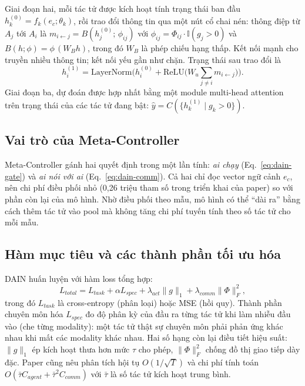 Giai đoạn hai, mỗi tác tử được kích hoạt tính trạng thái ban đầu $h^{(0)}_k = f_k(e_c;\theta_k)$, rồi trao đổi thông tin qua một nút cổ chai nén: thông điệp từ $A_j$ tới $A_i$ là $m_{i\leftarrow j} = B(h^{(0)}_j;\,\phi_{ij})$ với $\phi_{ij} = \Phi_{ij}\cdot\mathbb{I}(g_j > 0)$ và $B(h;\phi) = \phi\,(W_B h)$, trong đó $W_B$ là phép chiếu hạng thấp. Kết nối mạnh cho truyền nhiều thông tin; kết nối yếu gần như chặn. Trạng thái sau trao đổi là
\begin{equation}
h^{(1)}_i = \mathrm{LayerNorm}\Big(h^{(0)}_i + \mathrm{ReLU}\Big(W_u \textstyle\sum_{j\neq i} m_{i\leftarrow j}\Big)\Big).
\label{eq:dain-update}
\end{equation}
Giai đoạn ba, dự đoán được hợp nhất bằng một module multi-head attention trên trạng thái của các tác tử đang bật: $\hat{y} = C(\{h^{(1)}_k \mid g_k > 0\})$.

\subsection{Vai trò của Meta-Controller}
Meta-Controller gánh hai quyết định trong một lần tính: \emph{ai chạy} (Eq.~\ref{eq:dain-gate}) và \emph{ai nói với ai} (Eq.~\ref{eq:dain-comm}). Cả hai chỉ đọc vector ngữ cảnh $e_c$, nên chi phí điều phối nhỏ (0,26 triệu tham số trong triển khai của paper) so với phần còn lại của mô hình. Nhờ điều phối theo mẫu, mô hình có thể ``dài ra'' bằng cách thêm tác tử vào pool mà không tăng chi phí tuyến tính theo số tác tử cho mỗi mẫu.

\subsection{Hàm mục tiêu và các thành phần tối ưu hóa}
DAIN huấn luyện với hàm loss tổng hợp:
\begin{equation}
L_{total} = L_{task} + \alpha L_{spec} + \lambda_{act}\|g\|_1 + \lambda_{comm}\|\Phi\|_F^2,
\label{eq:dain-loss}
\end{equation}
trong đó $L_{task}$ là cross-entropy (phân loại) hoặc MSE (hồi quy). Thành phần chuyên môn hóa $L_{spec}$ đo độ phân kỳ của đầu ra từng tác tử khi làm nhiễu đầu vào (che từng modality): một tác tử thật sự chuyên môn phải phản ứng khác nhau khi mất các modality khác nhau. Hai số hạng còn lại điều tiết hiệu suất: $\|g\|_1$ ép kích hoạt thưa hơn mức $\tau$ cho phép, $\|\Phi\|_F^2$ chống đồ thị giao tiếp dày đặc. Paper cũng nêu phân tích hội tụ $O(1/\sqrt{T})$ và chi phí tính toán $O(\bar{\tau} C_{agent} + \bar{\tau}^2 C_{comm})$ với $\bar{\tau}$ là số tác tử kích hoạt trung bình.

